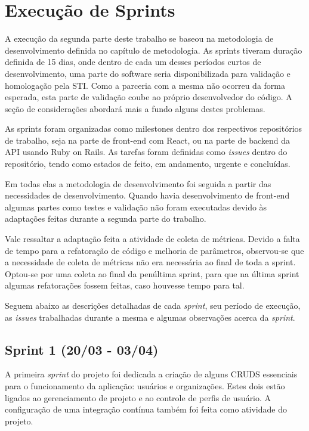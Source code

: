 \section{Execução de Sprints}

A execução da segunda parte deste trabalho se baseou na metodologia de desenvolvimento definida no capítulo de metodologia. As sprints tiveram duração definida de 15 dias, onde dentro de cada um desses períodos curtos de desenvolvimento, uma parte do software seria disponibilizada para validação e homologação pela STI. Como a parceria com a mesma não ocorreu da forma esperada, esta parte de validação coube ao próprio desenvolvedor do código. A seção de considerações abordará mais a fundo alguns destes problemas.

As sprints foram organizadas como milestones dentro dos respectivos repositórios de trabalho, seja na parte de front-end com React, ou na parte de backend da API usando Ruby on Rails. As tarefas foram definidas como \textit{issues} dentro do repositório, tendo como estados de feito, em andamento, urgente e concluídas.

Em todas elas a metodologia de desenvolvimento foi seguida a partir das necessidades de desenvolvimento. Quando havia desenvolvimento de front-end algumas partes como testes e validação não foram executadas devido às adaptações feitas durante a segunda parte do trabalho.

Vale ressaltar a adaptação feita a atividade de coleta de métricas. Devido a falta de tempo para a refatoração de código e melhoria de parâmetros, observou-se que a necessidade de coleta de métricas não era necessária ao final de toda a sprint. Optou-se por uma coleta ao final da penúltima sprint, para que na última sprint algumas refatorações fossem feitas, caso houvesse tempo para tal.

Seguem abaixo as descrições detalhadas de cada \textit{sprint}, seu período de execução, as \textit{issues} trabalhadas durante a mesma e algumas observações acerca da \textit{sprint}.

\subsection{Sprint 1 (20/03 - 03/04)}

A primeira \textit{sprint} do projeto foi dedicada a criação de alguns CRUDS essenciais para o funcionamento da aplicação: usuários e organizações. Estes dois estão ligados ao gerenciamento de projeto e ao controle de perfis de usuário. A configuração de uma integração contínua também foi feita como atividade do projeto.

